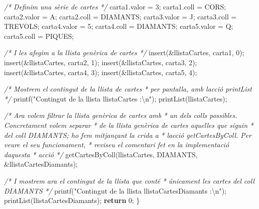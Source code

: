 \documentclass[
]{book}
\newenvironment{Shaded}{\begin{snugshade}}{\end{snugshade}}
\newcommand{\CharTok}[1]{\textcolor[rgb]{0.31,0.60,0.02}{#1}}
\newcommand{\CommentTok}[1]{\textcolor[rgb]{0.56,0.35,0.01}{\textit{#1}}}
\newcommand{\ControlFlowTok}[1]{\textcolor[rgb]{0.13,0.29,0.53}{\textbf{#1}}}
\newcommand{\DecValTok}[1]{\textcolor[rgb]{0.00,0.00,0.81}{#1}}
\newcommand{\NormalTok}[1]{#1}
\newcommand{\SpecialCharTok}[1]{\textcolor[rgb]{0.00,0.00,0.00}{#1}}
\newcommand{\StringTok}[1]{\textcolor[rgb]{0.31,0.60,0.02}{#1}}
\begin{document}
\begin{Shaded}
\begin{Highlighting}[]
    \CommentTok{/* Definim una sèrie de cartes */}
\NormalTok{    carta1.valor = }\CharTok{\textquotesingle{}3\textquotesingle{}}\NormalTok{;}
\NormalTok{    carta1.coll = CORS;}
\NormalTok{    carta2.valor = }\CharTok{\textquotesingle{}A\textquotesingle{}}\NormalTok{;}
\NormalTok{    carta2.coll = DIAMANTS;}
\NormalTok{    carta3.valor = }\CharTok{\textquotesingle{}J\textquotesingle{}}\NormalTok{;}
\NormalTok{    carta3.coll = TREVOLS;}
\NormalTok{    carta4.valor = }\CharTok{\textquotesingle{}5\textquotesingle{}}\NormalTok{;}
\NormalTok{    carta4.coll = DIAMANTS;}
\NormalTok{    carta5.valor = }\CharTok{\textquotesingle{}Q\textquotesingle{}}\NormalTok{;}
\NormalTok{    carta5.coll = PIQUES;}

    \CommentTok{/* I les afegim a la llista genèrica de cartes */}
\NormalTok{    insert(\&llistaCartes, carta1, }\DecValTok{0}\NormalTok{);}
\NormalTok{    insert(\&llistaCartes, carta2, }\DecValTok{1}\NormalTok{);}
\NormalTok{    insert(\&llistaCartes, carta3, }\DecValTok{2}\NormalTok{);}
\NormalTok{    insert(\&llistaCartes, carta4, }\DecValTok{3}\NormalTok{);}
\NormalTok{    insert(\&llistaCartes, carta5, }\DecValTok{4}\NormalTok{);}

    \CommentTok{/* Mostrem el contingut de la llista de cartes}
\CommentTok{     * per pantalla, amb l\textquotesingle{}acció printList }
\CommentTok{     */}
\NormalTok{    printf(}\StringTok{"Contingut de la llista \textquotesingle{}llistaCartes\textquotesingle{} :}\SpecialCharTok{\textbackslash{}n}\StringTok{"}\NormalTok{);}
\NormalTok{    printList(llistaCartes);}

    \CommentTok{/* Ara volem filtrar la llista genèrica de cartes amb}
\CommentTok{     * un dels colls possibles. Concretament volem separar }
\CommentTok{     * de la llista genèrica de cartes aquelles que siguin }
\CommentTok{     * del coll DIAMANTS; ho fem mitjançant la crida a }
\CommentTok{     * l\textquotesingle{}acció getCartesByColl. Per veure el seu funcionament,}
\CommentTok{     * reviseu el comentari fet en la implementació d\textquotesingle{}aquesta}
\CommentTok{     * acció }
\CommentTok{     */}
\NormalTok{    getCartesByColl(llistaCartes, DIAMANTS, \&llistaCartesDiamants);}

    \CommentTok{/* I mostrem ara el contingut de la llista que conté}
\CommentTok{     * únicament les cartes del coll DIAMANTS }
\CommentTok{     */}
\NormalTok{    printf(}\StringTok{"Contingut de la llista \textquotesingle{}llistaCartesDiamants\textquotesingle{} :}\SpecialCharTok{\textbackslash{}n}\StringTok{"}\NormalTok{);}
\NormalTok{    printList(llistaCartesDiamants);}
    \ControlFlowTok{return} \DecValTok{0}\NormalTok{;}
\NormalTok{\}}


\end{Highlighting}
\end{Shaded}
\end{document}
